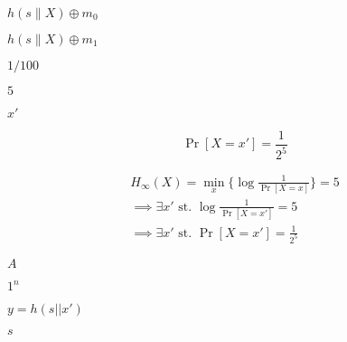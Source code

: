 \documentclass[10pt]{book}
\begin{document}
\begin{mdSnippets}
\begin{mdInlineSnippet}[11eabd97e4170662dc605b2c981aa517]%
$h(s\|X)\oplus m_0$\end{mdInlineSnippet}%
\begin{mdInlineSnippet}%
$h(s\|X)\oplus m_1$\end{mdInlineSnippet}%
\begin{mdInlineSnippet}[9508f797f871052cfe8a901284497ab2]%
$1/100$\end{mdInlineSnippet}%
\begin{mdInlineSnippet}[e4da3b7fbbce2345d7772b0674a318d5]%
$5$\end{mdInlineSnippet}%
\begin{mdInlineSnippet}%
$x'$\end{mdInlineSnippet}%
\begin{mdDisplaySnippet}[8c79bf3f6820aa4386861da0dc016bac]%
\[%
\Pr[X = x'] = \frac{1}{2^5}
\]%
\end{mdDisplaySnippet}%
\begin{mdDisplaySnippet}[ad86259271205dc367d93741f2a33c47]%
\[%
\begin{aligned}
H_{\infty}(X) = \min_x \{\log \frac{1}{\Pr[X = x]} \} = 5 \\
\implies \exists x' \text{ st. } \log \frac{1}{\Pr[X= x']} = 5 \\
\implies  \exists x' \text{ st. } \Pr[X = x'] = \frac{1}{2^5}
\end{aligned}
\]%
\end{mdDisplaySnippet}%
\begin{mdInlineSnippet}[7fc56270e7a70fa81a5935b72eacbe29]%
$A$\end{mdInlineSnippet}%
\begin{mdInlineSnippet}%
$1^n$\end{mdInlineSnippet}%
\begin{mdInlineSnippet}[f62f70e21a6e7b6c27aa7e4a5b606afc]%
$y = h(s || x')$\end{mdInlineSnippet}%
\begin{mdInlineSnippet}[03c7c0ace395d80182db07ae2c30f034]%
$s$\end{mdInlineSnippet}%

\end{mdSnippets}
\end{document}
